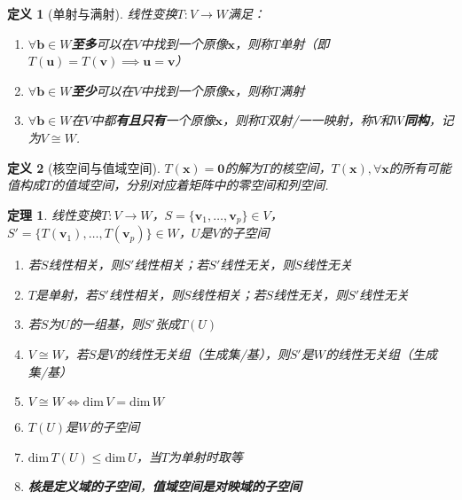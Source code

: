 \documentclass[11pt,UTF8]{ctexart}
\newtheorem{theorem}{定理}
\newtheorem{definition}{定义}
\def\vx{\mathbf{x}}
\def\dim{\mathrm{dim}\,}
\newcommand{\vb}[1]{\mathbf{#1}}
\begin{document}
\begin{definition}[单射与满射]
线性变换$T:V\to W$满足：
\begin{enumerate}
	\itemsep -3pt
	\item $\forall\vb{b}\in W$\textbf{至多}可以在$V$中找到一个原像$\vx$，则称$T$单射（即$T(\vb{u})=T(\vb{v})\implies \vb{u}=\vb{v}$）
	\item $\forall\vb{b}\in W$\textbf{至少}可以在$V$中找到一个原像$\vx$，则称$T$满射
	\item $\forall\vb{b}\in W$在$V$中都\textbf{有且只有}一个原像$\vx$，则称$T$双射/一一映射，称$V$和$W$\textbf{同构}，记为$V\cong W$.
\end{enumerate}
\end{definition}
\begin{definition}[核空间与值域空间]
$T(\vx)=\vb{0}$的解为$T$的核空间，$T(\vx),\forall\vx$的所有可能值构成$T$的值域空间，分别对应着矩阵中的零空间和列空间.
\end{definition}
\begin{theorem}%
\label{lt_theo}
线性变换$T:V\to W$，$S=\{\vb{v}_1,\dots,\vb{v}_p\}\in V$，$S'=\{T(\vb{v}_1),\dots,T(\vb{v}_p)\}\in W$，$U$是$V$的子空间
\begin{enumerate}
	\itemsep -3pt
	\item \label{l1}若$S$线性相关，则$S'$线性相关；若$S'$线性无关，则$S$线性无关
	\item \label{l2}$T$是单射，若$S'$线性相关，则$S$线性相关；若$S$线性无关，则$S'$线性无关
	\item \label{l3}若$S$为$U$的一组基，则$S'$张成$T(U)$
	\item \label{l4}$V\cong W$，若$S$是$V$的线性无关组（生成集/基），则$S'$是$W$的线性无关组（生成集/基）
	\item $V\cong W\iff\dim V=\dim W$
	\item \label{subspace_range}$T(U)$是$W$的子空间
	\item $\dim T(U)\leq\dim U$，当$T$为单射时取等
	\item \textbf{核是定义域的子空间}，\textbf{值域空间是对映域的子空间}
\end{enumerate}
\end{theorem}
\end{document}
